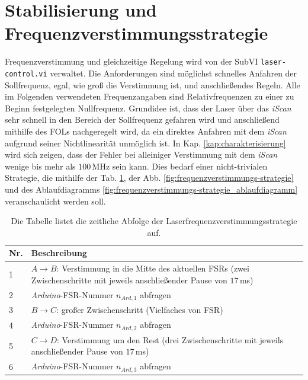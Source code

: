 \section{Stabilisierung
und
Frequenzverstimmungsstrategie}\label{sec:stabilisierung_frequenzverstimmungs-strategie}
Frequenzverstimmung und gleichzeitige Regelung wird von der SubVI \lstinline|laser-control.vi| verwaltet. Die Anforderungen sind möglichst schnelles Anfahren der Sollfrequenz, egal, wie groß die Verstimmung ist, und
anschließendes Regeln. Alle im Folgenden verwendeten Frequenzangaben sind
Relativfrequenzen zu einer zu Beginn festgelegten Nullfrequenz. Grundidee ist,
dass der Laser über das \textit{iScan} sehr schnell in den Bereich der
Sollfrequenz gefahren wird und anschließend mithilfe des FOLs nachgeregelt wird,
da ein direktes Anfahren mit dem \textit{iScan} aufgrund seiner Nichtlinearität unmöglich ist. In Kap. \ref{kap:charakterisierung} wird sich zeigen, dass der Fehler bei
alleiniger Verstimmung mit dem \textit{iScan} wenige bis mehr als $100\,$MHz sein kann.
Dies bedarf einer nicht-trivialen Strategie, die mithilfe der Tab.
\ref{tab:scan-strategie_abfolge}, der Abb.
\ref{fig:frequenzverstimmungs-strategie} und des Ablaufdiagramms
\ref{fig:frequenzverstimmungs-strategie_ablaufdiagramm} veranschaulicht werden
soll.\par
\begin{table}
	\begin{tabular}{p{}p{}}
		\toprule
			Nr. & Beschreibung \\
		\midrule[1px]
		\hline
			1 & $A\rightarrow B$: Verstimmung in die Mitte des aktuellen FSRs (zwei
			Zwischenschritte mit jeweils anschließender Pause von $17\,$ms)\\
			2 & \textit{Arduino}-FSR-Nummer $n_{Ard,1}$ abfragen\\
			3 & $B\rightarrow C$: großer Zwischenschritt (Vielfaches von FSR)\\
			4 & \textit{Arduino}-FSR-Nummer $n_{Ard,2}$ abfragen\\
			5 & $C\rightarrow D$: Verstimmung um den Rest (drei Zwischenschritte mit
			jeweils anschließender Pause von $17\,$ms)\\
			6 & \textit{Arduino}-FSR-Nummer $n_{Ard,3}$ abfragen\\
		\bottomrule[1px]
	\end{tabular}
	\caption[Laserfrequenzverstimmungs-Strategie]{Die Tabelle listet die zeitliche
	Abfolge der Laserfrequenzverstimmungsstrategie auf.}
	\label{tab:scan-strategie_abfolge}
\end{table}
